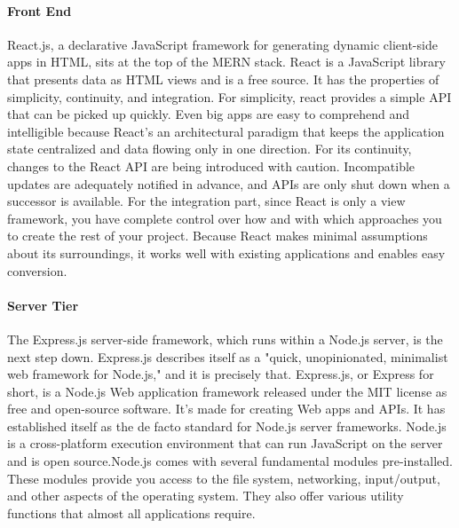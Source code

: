 \documentclass[a4paper, 11pt]{report}
\begin{document}
\paragraph{Front End} 
React.js, a declarative JavaScript framework for generating dynamic client-side apps in HTML, sits at the top of the MERN stack. \cite{(MongoDB, n.d.)} React is a JavaScript library that presents data as HTML views and is a free source. It has the properties of simplicity, continuity, and integration. For simplicity, react provides a simple API that can be picked up quickly. Even big apps are easy to comprehend and intelligible because React's an architectural paradigm that keeps the application state centralized and data flowing only in one direction. For its continuity, changes to the React API are being introduced with caution. Incompatible updates are adequately notified in advance, and APIs are only shut down when a successor is available. For the integration part, since React is only a view framework, you have complete control over how and with which approaches you to create the rest of your project. Because React makes minimal assumptions about its surroundings, it works well with existing applications and enables easy conversion. \cite{(Zeigermann & Hartmann, 2016)}\\

\paragraph{Server Tier}
The Express.js server-side framework, which runs within a Node.js server, is the next step down. Express.js describes itself as a "quick, unopinionated, minimalist web framework for Node.js," and it is precisely that. Express.js, or Express for short, is a Node.js Web application framework released under the MIT license as free and open-source software. It's made for creating Web apps and APIs. It has established itself as the de facto standard for Node.js server frameworks. Node.js is a cross-platform execution environment that can run JavaScript on the server and is open source.Node.js comes with several fundamental modules pre-installed. These modules provide you access to the file system, networking, input/output, and other aspects of the operating system. They also offer various utility functions that almost all applications require. \cite{(Vasan Subramanian, 2019)}\\
\end{document}
